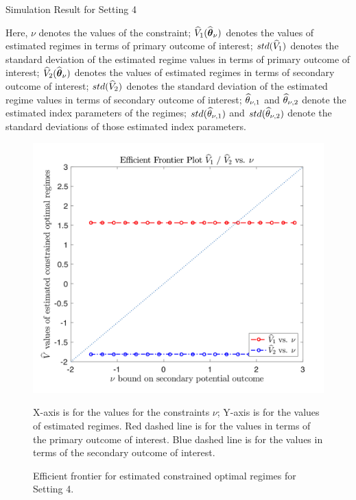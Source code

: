 \begin{table}[!htbp]
	\caption {Simulation Result for Setting 4}
	\centering
	{\tt
		
	}
	\justify
	Here, $\nu$ denotes the values of the constraint; $\widehat{V}_1(\widehat{\boldsymbol{\theta}}_{\nu})$ denotes the values of estimated regimes in terms of primary outcome of interest; $std(\widehat{V}_1)$ denotes the standard deviation of the estimated regime values in terms of primary outcome of interest; $\widehat{V}_2(\widehat{\boldsymbol{\theta}}_{\nu})$ denotes the values of estimated regimes in terms of secondary outcome of interest; $std(\widehat{V}_2)$ denotes the standard deviation of the estimated regime values in terms of secondary outcome of interest; $\widehat{\theta}_{\nu,1}$ and $\widehat{\theta}_{\nu,2}$ denote the estimated index parameters of the regimes; $std(\widehat{\theta}_{\nu,1})$ and $std(\widehat{\theta}_{\nu,2})$ denote the standard deviations of those estimated index parameters.	
\end{table} 
\begin{figure}[!htb]
	\centering
	\includegraphics[width=.9\linewidth]{./Chapter-1/figs/efficient_plot4.png}
	\caption{Efficient frontier for estimated constrained optimal regimes for Setting 4.}
	\label{fig:4}
	\justify
X-axis is for the values for the constraints $\nu$; Y-axis is for the values of estimated regimes. Red dashed line is for the values in terms of the primary outcome of interest. Blue dashed line is for the values in terms of the secondary outcome of interest.
\end{figure}
